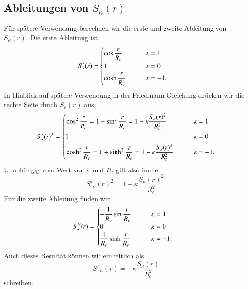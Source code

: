 \subsection{Ableitungen von $S_\kappa(r)$}
Für spätere Verwendung berechnen wir die erste und zweite Ableitung 
von $S_\kappa(r)$.
Die erste Ableitung ist
\begin{align*}
S'_\kappa(r)
&=
\begin{cases}
\cos \displaystyle\frac{\mathstrut r}{R_c}&\qquad \kappa= 1\\
1                                         &\qquad \kappa= 0\\
\cosh\displaystyle\frac{\mathstrut r}{R_c}&\qquad \kappa=-1.
\end{cases}
\end{align*}
In Hinblick auf spätere Verwendung in der Friedmann-Gleichung drücken wir
die rechte Seite durch $S_\kappa(r)$ aus. 
\begin{equation}
S'_\kappa(r)^2
=
\left\{
\begin{aligned}
&\cos^2\displaystyle\frac{\mathstrut r}{R_c}
=
1-\sin^2\displaystyle\frac{\mathstrut r}{R_c}
=
1-\kappa \frac{S_\kappa(r)^2}{R_c^2}&&\qquad\kappa=1\\
&1&&\qquad\kappa=0\\
&\cosh^2\displaystyle\frac{\mathstrut r}{R_c}
=
1+\sinh^2\displaystyle\frac{\mathstrut r}{R_c}
=
1-\kappa \frac{S_\kappa(r)^2}{R_c^2}&&\qquad\kappa=-1.
\end{aligned}
\right.
\end{equation}
Unabhängig vom Wert von $\kappa$ und $R_c$ gilt also immer
\begin{equation}
S'_\kappa(r)^2 = 1-\kappa \frac{S_\kappa(r)^2}{R_c^2}.
\label{skript:robertson:ersteableitung}
\end{equation}
Für die zweite Ableitung finden wir
\begin{align*}
S''_\kappa(r)
&=
\begin{cases}
\displaystyle-\frac{1}{R_c}\sin \frac{\mathstrut r}{R_c}&\qquad \kappa= 1\\
0                                                       &\qquad \kappa= 0\\
\displaystyle \frac{1}{R_c}\sinh\frac{\mathstrut r}{R_c}&\qquad \kappa=-1.
\end{cases}
\end{align*}
Auch dieses Resultat können wir einheitlich als
\begin{equation}
S''_\kappa(r)
=
-\kappa\displaystyle \frac{S_\kappa(r)}{R_c^2}
\label{skript:robertson:zweiteableitung}
\end{equation}
schreiben.

